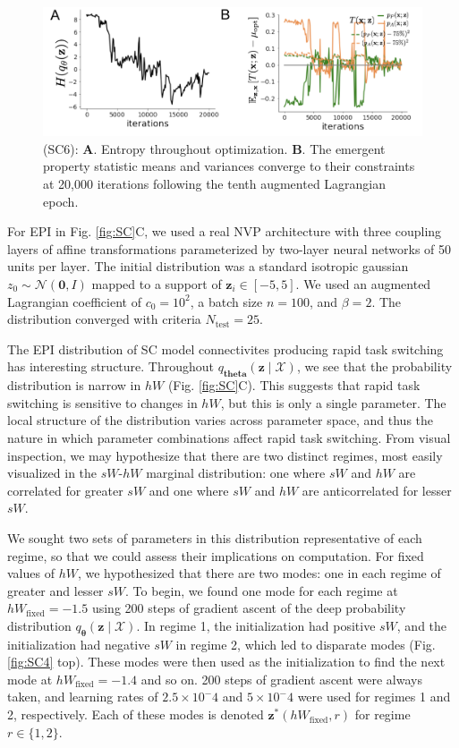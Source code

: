 \documentclass[11pt]{article}
\begin{document}
\begin{figure}
\begin{center}
\includegraphics[scale=0.5]{figures/figSC6/figSC6.pdf}
\end{center}
\caption{\small (SC6): 
\textbf{A}. Entropy throughout optimization. 
\textbf{B}. The emergent property statistic means and variances converge to their constraints at 20,000 iterations following the tenth augmented Lagrangian epoch.
}
\label{fig:SC6}
\end{figure}

For EPI in Fig. \ref{fig:SC}C, we used a real NVP architecture with three coupling layers of affine transformations parameterized by two-layer neural networks of 50 units per layer.
The initial distribution was a standard isotropic gaussian $z_0 \sim \mathcal{N}(\mathbf{0}, I)$ mapped to a support of $\mathbf{z}_i \in [-5, 5]$. 
We used an augmented Lagrangian coefficient of $c_0 = 10^{2}$, a batch size $n=100$, and $\beta=2$.
The distribution converged with criteria $N_{\text{test}} = 25$.

The EPI distribution of SC model connectivites producing rapid task switching has interesting structure.
Throughout $q_{\bm{theta}}(\mathbf{z} \mid \mathcal{X})$, we see that the probability distribution is narrow in $hW$ (Fig. \ref{fig:SC}C).
This suggests that rapid task switching is sensitive to changes in $hW$, but this is only a single parameter.
The local structure of the distribution varies across parameter space, and thus the nature in which parameter combinations affect rapid task switching.
From visual inspection, we may hypothesize that there are two distinct regimes, most easily visualized in the $sW$-$hW$ marginal distribution: one where $sW$ and $hW$ are correlated for greater $sW$ and one where $sW$ and $hW$ are anticorrelated for lesser $sW$.

We sought two sets of parameters in this distribution representative of each regime, so that we could assess their implications on computation.
For fixed values of $hW$, we hypothesized that there are two modes: one in each regime of greater and lesser $sW$.
To begin, we found one mode for each regime at $hW_{\text{fixed}} = -1.5$ using 200 steps of gradient ascent of the deep probability distribution $q_{\bm{\theta}}(\mathbf{z} \mid \mathcal{X})$.
In regime 1, the initialization had positive $sW$, and the initialization had negative $sW$ in regime 2, which led to disparate modes (Fig. \ref{fig:SC4} top).
These modes were then used as the initialization to find the next mode at $hW_{\text{fixed}} = -1.4$ and so on.
200 steps of gradient ascent were always taken, and learning rates of $2.5 \times 10^-4$ and $5 \times 10^-4$ were used for regimes 1 and 2, respectively.
Each of these modes is denoted $\mathbf{z}^*(hW_{\text{fixed}}, r)$ for regime $r \in \{1, 2\}$.
\end{document}
